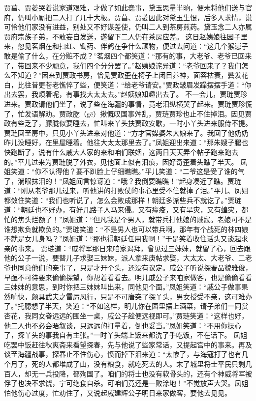 \documentclass[12pt,oneside]{book}
\begin{document}
贾菖、贾菱哭着说家道艰难，才做了如此蠢事，黛玉思量半晌，便未将他们送与官府，仍叫小厮把二人打了几十大板。贾菖、贾菱因此对黛玉生恨，后多人求情，说可怜他们家没有进益，别处又不好谋差使，仍叫二人到茶房煎药。黛玉念二人亦属贾府宗族子弟，不敢妄自发送，遂留下二人仍在茶房应差。
这日赵姨娘往园子里来，忽见茗烟在和扫红、锄药、伴鹤在争什么顽物，便过去问道：“这几个猴崽子敢是偷了什么，在分赃不成？”茗烟四个都笑道：“那有的事，大老爷、老爷已回来了，带回来不少顽意，我们四个分分罢了。”赵姨娘诧异道：“老爷回来了？我们怎么不知道？”因来到贾政书房，恰见贾政歪在椅子上闭目养神，面容枯衰，鬓发花白，比往昔更苍老憔悴了些，便笑道：“给老爷请安。”贾政皱眉发躁摆摆手道：“你出去罢，我烦着呢，有事找大太太去。”赵姨娘知趣出去了。
不一会儿，贾琏贾珍进来。贾政请他们坐了，说了些在海疆的事情，竟老泪纵横哭了起来。贾琏贾珍慌了，忙发语解劝。贾政肐（gē）揪慨叹国事舛乱，贾琏贾珍也止不住掉泪。因见贾政有些乏了，朦胧似要睡去，忙叫来丫头扶贾政安歇，一时小丫头进来服侍不提。
贾琏回至房中，只见小丫头进来对他道：“方才官媒婆朱大娘来了。我回了他奶奶昨儿没睡好，在里屋睡着。他往大太太那里去了。”凤姐迎出来道：“那朱嫂子腿也快跑断了，说有什么戚大人家的来和咱们联姻，这两日天天弄个帖子跑来跑去的。”平儿过来为贾琏脱了外衣，见他面上似有泪痕，因好奇歪着头瞧了半天。
凤姐笑道：“你不认得他？要不趴脸上仔细瞧瞧。”平儿笑道：“二爷这是受了谁的气了，淌眼抹泪的！”凤姐闻言惊讶道：“哦？我倒要瞧瞧！”起身凑近了瞧。贾琏道：“刚从老爷那儿过来，听他讲的打败仗的事心里受不住就掉了泪。”平儿、凤姐都敛住笑道：“我们也听说了，怎么会败成那样！朝廷多派些兵不就讫了。”贾琏道：“朝廷也不好办，有好几路子人马来侵。又有瘴疫，又有旱灾，又有蝗灾，都忙的焦头烂额了！”凤姐道：“但凡我是个男人，就带兵打他娘的贼寇。老娘可不是谁想欺负就欺负的。”贾琏笑道：“不是男人也可以带兵啊，那年有个战死的林四娘不就是女儿身吗？”凤姐道：“那也得朝廷任用我啊！”于是笑着收住话头又谈起求亲的事来。
贾琏道：“戚将军那日来咱家谒拜，曾见过三妹妹，就留了心，回去跟他的公子一说，要替儿子求娶三妹妹，派人拿来庚帖求娶，大太太、大老爷、二老爷也同意他们的亲事了，只是才开个头，还没有议定。戚公子听说探春品貌雅俊，早亟不可待要来偷偷探望，你帮着看看去。明儿戚公子来咱家做客，也是偷偷看看三妹妹的意思，到时你把三妹妹叫出来，同他见个面。”凤姐笑道：“戚公子做事果然响快，颇具武夫之雷厉风行，只是不可唐突了探丫头，男女授受不亲，这可难办了。”托腮想了半天，笑道：“不如这样，明儿你在园里摆上酒菜，请子弟们一同赏杏花，我同女眷远远的围坐一桌，戚公子趁便远视即可。”贾琏笑道：“这样也好，他二人也不必会晤叙谈，只远远的打量着，倒也妥当。”凤姐笑道：“不用你操心了，探丫头的事我自有主张。”一时丫头端上饭来都洗了手吃饭，不在话下。
凤姐吃罢中饭赶往秋爽斋来看望探春，先与他说了些家常话，又提起宫中的事来。再及谈至海疆战事，探春止不住伤心，愤而掉下泪来道：“太惨了，与海寇打了也有几个月了，死的人都堆成了山，没有粮食，就吃死去的人。末了城里将士平民只剩几百人，却无一兵投降，都殉国了。咱们的将士也没有软骨头的，还有个神威将军被俘了也决不求饶，宁可绝食自杀。可咱们竟还是一败涂地！”不觉放声大哭。凤姐怕他伤心过度，忙劝住了，又说起戚建辉公子明日来家做客，要他去见见。
\end{document}

